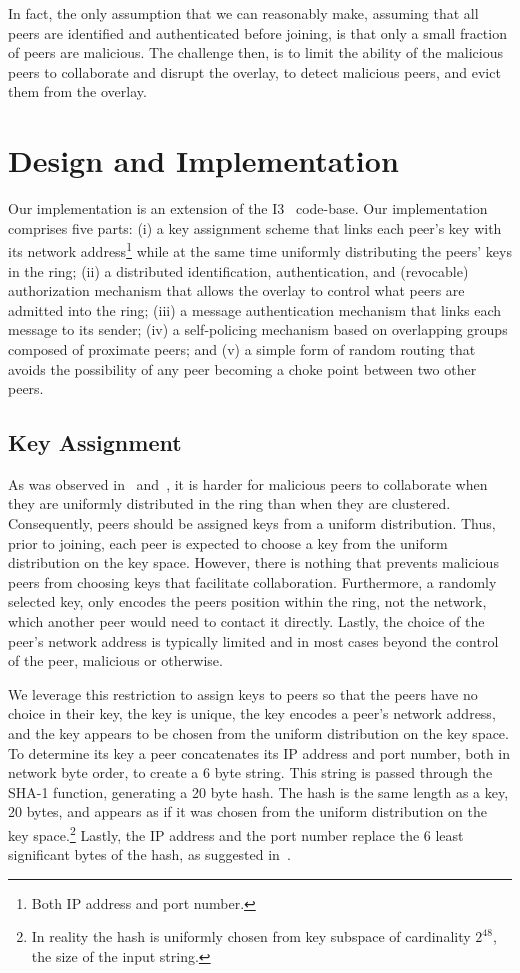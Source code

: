 \documentclass[11pt]{article}
\begin{document}
In fact, the only assumption that we can reasonably make, assuming
that all peers are identified and authenticated before joining, is
that only a small fraction of peers are malicious.  The challenge
then, is to limit the ability of the malicious peers to collaborate
and disrupt the overlay, to detect malicious peers, and evict them 
from the overlay.


\section{Design and Implementation}\label{sec:imp}
Our implementation is an extension of the I3~\cite{StAdZhShSu04}
code-base.  Our implementation comprises five parts: (i) a key
assignment scheme that links each peer's key with its network
address\footnote{Both IP address and port number.} while at the
same time uniformly distributing the peers' keys in the ring; (ii)
a distributed identification, authentication, and (revocable)
authorization mechanism that allows the overlay to control what
peers are admitted into the ring; (iii) a message authentication
mechanism that links each message to its sender; (iv) a self-policing
mechanism based on overlapping groups composed of proximate peers;
and (v) a simple form of random routing that avoids the possibility
of any peer becoming a choke point between two other peers.


\subsection{Key Assignment}
As was observed in~\cite{SiMo02} and~\cite{CaDrGaRoWa02}, it is
harder for malicious peers to collaborate when they are uniformly
distributed in the ring than when they are clustered.  Consequently,
peers should be assigned keys from a uniform distribution.  Thus,
prior to joining, each peer is expected to choose a key from the
uniform distribution on the key space.  However, there is nothing
that prevents malicious peers from choosing keys that facilitate
collaboration.  Furthermore, a randomly selected key, only encodes
the peers position within the ring, not the network, which another
peer would need to contact it directly.  Lastly, the choice of the
peer's network address is typically limited and in most cases beyond
the control of the peer, malicious or otherwise.

We leverage this restriction to assign keys to peers so that the
peers have no choice in their key, the key is unique, the key encodes
a peer's network address, and the key appears to be chosen from the
uniform distribution on the key space.  To determine its key a peer
concatenates its IP address and port number, both in network byte
order, to create a 6 byte string.  This string is passed through
the SHA-1 function, generating a 20 byte hash.  The hash is the
same length as a key, 20 bytes, and appears as if it was chosen
from the uniform distribution on the key space.\footnote{In reality
the hash is uniformly chosen from key subspace of cardinality
$2^{48}$, the size of the input string.}  Lastly, the IP address
and the port number replace the 6 least significant bytes of the
hash, as suggested in~\cite{CaDrGaRoWa02}.
\end{document}

